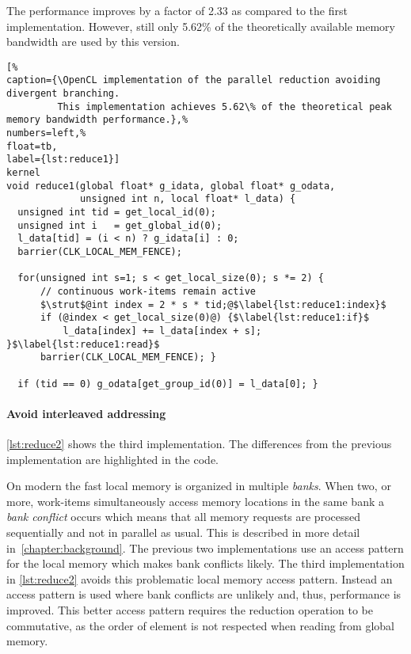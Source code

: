 The performance improves by a factor of 2.33 as compared to the first implementation.
However, still only 5.62\% of the theoretically available memory bandwidth are used by this version.

\begin{lstlisting}[%                                                             
caption={\OpenCL implementation of the parallel reduction avoiding divergent branching.
         This implementation achieves 5.62\% of the theoretical peak memory bandwidth performance.},%
numbers=left,%
float=tb,
label={lst:reduce1}]
kernel
void reduce1(global float* g_idata, global float* g_odata,
             unsigned int n, local float* l_data) {
  unsigned int tid = get_local_id(0);
  unsigned int i   = get_global_id(0);
  l_data[tid] = (i < n) ? g_idata[i] : 0;
  barrier(CLK_LOCAL_MEM_FENCE);

  for(unsigned int s=1; s < get_local_size(0); s *= 2) {
      // continuous work-items remain active
      $\strut$@int index = 2 * s * tid;@$\label{lst:reduce1:index}$
      if (@index < get_local_size(0)@) {$\label{lst:reduce1:if}$
          l_data[index] += l_data[index + s]; }$\label{lst:reduce1:read}$
      barrier(CLK_LOCAL_MEM_FENCE); }

  if (tid == 0) g_odata[get_group_id(0)] = l_data[0]; }
\end{lstlisting}


\paragraph{Avoid interleaved addressing}

\autoref{lst:reduce2} shows the third implementation.
The differences from the previous implementation are highlighted in the code.

On modern \GPUs the fast local memory is organized in multiple \emph{banks}.
When two, or more, work-items simultaneously access memory locations in the same bank a \emph{bank conflict} occurs which means that all memory requests are processed sequentially and not in parallel as usual.
This is described in more detail in~\autoref{chapter:background}.
The previous two implementations use an access pattern for the local memory which makes bank conflicts likely.
The third implementation in \autoref{lst:reduce2} avoids this problematic local memory access pattern.
Instead an access pattern is used where bank conflicts are unlikely and, thus, performance is improved.
This better access pattern requires the reduction operation to be commutative, as the order of element is not respected when reading from global memory.

